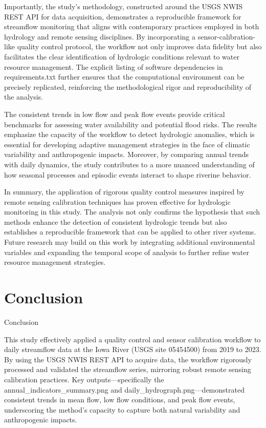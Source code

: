 \documentclass[preprint,12pt]{elsarticle}
\begin{document}
Importantly, the study's methodology, constructed around the USGS NWIS REST API for data acquisition, demonstrates a reproducible framework for streamflow monitoring that aligns with contemporary practices employed in both hydrology and remote sensing disciplines. By incorporating a sensor-calibration-like quality control protocol, the workflow not only improves data fidelity but also facilitates the clear identification of hydrologic conditions relevant to water resource management. The explicit listing of software dependencies in requirements.txt further ensures that the computational environment can be precisely replicated, reinforcing the methodological rigor and reproducibility of the analysis.

The consistent trends in low flow and peak flow events provide critical benchmarks for assessing water availability and potential flood risks. The results emphasize the capacity of the workflow to detect hydrologic anomalies, which is essential for developing adaptive management strategies in the face of climatic variability and anthropogenic impacts. Moreover, by comparing annual trends with daily dynamics, the study contributes to a more nuanced understanding of how seasonal processes and episodic events interact to shape riverine behavior.

In summary, the application of rigorous quality control measures inspired by remote sensing calibration techniques has proven effective for hydrologic monitoring in this study. The analysis not only confirms the hypothesis that such methods enhance the detection of consistent hydrologic trends but also establishes a reproducible framework that can be applied to other river systems. Future research may build on this work by integrating additional environmental variables and expanding the temporal scope of analysis to further refine water resource management strategies.


\section{Conclusion}

Conclusion

This study effectively applied a quality control and sensor calibration workflow to daily streamflow data at the Iowa River (USGS site 05454500) from 2019 to 2023. By using the USGS NWIS REST API to acquire data, the workflow rigorously processed and validated the streamflow series, mirroring robust remote sensing calibration practices. Key outputs—specifically the annual\_indicators\_summary.png and daily\_hydrograph.png—demonstrated consistent trends in mean flow, low flow conditions, and peak flow events, underscoring the method's capacity to capture both natural variability and anthropogenic impacts.
\end{document}
